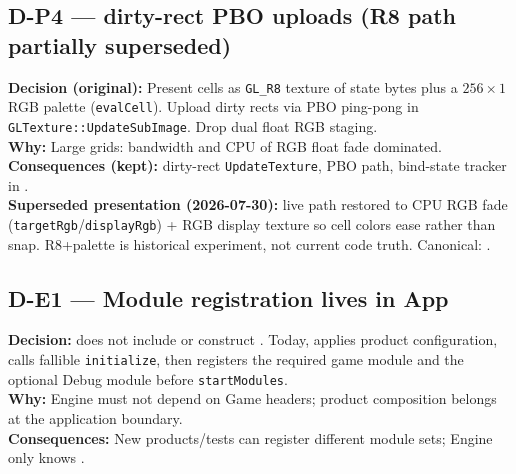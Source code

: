 \subsection*{D-P4 --- dirty-rect PBO uploads (R8 path partially superseded)}
\begin{decisionbox}[title={D-P4 \quad 2026-07-28}]
\textbf{Decision (original):} Present cells as \texttt{GL\_R8} texture of state
bytes plus a $256\times 1$ RGB palette (\texttt{evalCell}). Upload dirty rects
via PBO ping-pong in \texttt{GLTexture::UpdateSubImage}. Drop dual float RGB
staging.\\
\textbf{Why:} Large grids: bandwidth and CPU of RGB float fade dominated.\\
\textbf{Consequences (kept):} dirty-rect \texttt{UpdateTexture}, PBO path,
bind-state tracker in .\\
\textbf{Superseded presentation (2026-07-30):} live path restored to CPU RGB
fade (\texttt{targetRgb}/\texttt{displayRgb}) + RGB display texture so cell
colors ease rather than snap. R8+palette is historical experiment, not current
code truth. Canonical: .
\end{decisionbox}

\subsection*{D-E1 --- Module registration lives in App}
\begin{decisionbox}[title={D-E1 \quad 2026-07-28}]
\textbf{Decision:}  does not include or construct
. Today,
 applies product configuration,
calls fallible \texttt{initialize}, then registers the required game module and
the optional Debug module before \texttt{startModules}.\\
\textbf{Why:} Engine must not depend on Game headers; product composition
belongs at the application boundary.\\
\textbf{Consequences:} New products/tests can register different module sets;
Engine only knows .
\end{decisionbox}

